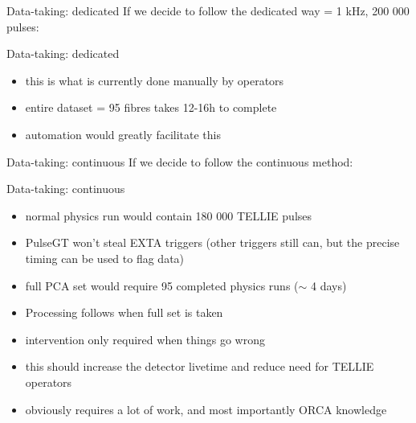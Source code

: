 \documentclass[xcolor=table]{beamer}
\begin{document}
\begin{frame}{Data-taking: dedicated}
If we decide to follow the dedicated way = 1 kHz, 200 000 pulses:
\noindent{}
\end{frame}

\begin{frame}{Data-taking: dedicated}
\begin{itemize}
	\item this is what is currently done manually by operators
	\item entire dataset = 95 fibres takes 12-16h to complete
	\item automation would greatly facilitate this
\end{itemize}
\end{frame}

\begin{frame}{Data-taking: continuous}
If we decide to follow the continuous method:
\noindent{}
\end{frame}

\begin{frame}{Data-taking: continuous}
\begin{itemize}
	\item normal physics run would contain 180 000 TELLIE pulses
	\item PulseGT won't steal EXTA triggers (other triggers still can, but the precise timing can be used to flag data)
	\item full PCA set would require 95 completed physics runs ($\sim$ 4 days)
	\item Processing follows when full set is taken
	\item intervention only required when things go wrong
	\item this should increase the detector livetime and reduce need for TELLIE operators
	\item obviously requires a lot of work, and most importantly ORCA knowledge
\end{itemize}
\end{frame}
\end{document}
